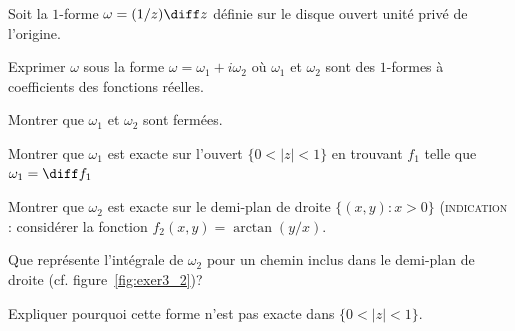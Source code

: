 \begin{exer}
Soit la $1$-forme $\omega=(1/z) \diff z$ définie sur le disque ouvert unité privé de l'origine. 
\begin{MYenumerate}
\item Exprimer $\omega$ sous la forme $\omega = \omega_1 + i \omega_2$ où $\omega_1$ et $\omega_2$ sont des $1$-formes à coefficients des fonctions réelles.
\item Montrer que $\omega_1$ et $\omega_2$ sont fermées.
\item Montrer que $\omega_1$ est exacte sur l'ouvert $\{ 0<\lvert z \rvert <1\}$ en trouvant $f_1$ telle que $\omega_1=\diff f_1$
\item Montrer que $\omega_2$ est exacte sur le demi-plan de droite $\{ (x,y) : x>0\}$ (\textsc{indication :} considérer la fonction $f_2(x,y)=\arctan(y/x)$. 
\item Que représente l'intégrale de $\omega_2$ pour un chemin inclus dans le demi-plan de droite (cf. figure~\ref{fig:exer3_2})?
\item Expliquer pourquoi cette forme n'est pas exacte dans $\{ 0<\lvert z \rvert <1\}$. 
 \end{MYenumerate}
\begin{figure}[H]
\begin{center}
\shorthandoff{!}\shorthandoff{:}
\end{center}
\end{figure}
\end{exer}
